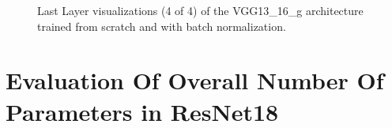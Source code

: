 \begin{figure}[!h]
\centering
\caption{Last Layer visualizations (4 of 4) of the VGG13\_16\_g architecture trained from scratch and with batch normalization.}
\label{fig:vgg13_g_filter_activation}
\end{figure}











\section{Evaluation Of Overall Number Of Parameters in ResNet18}

